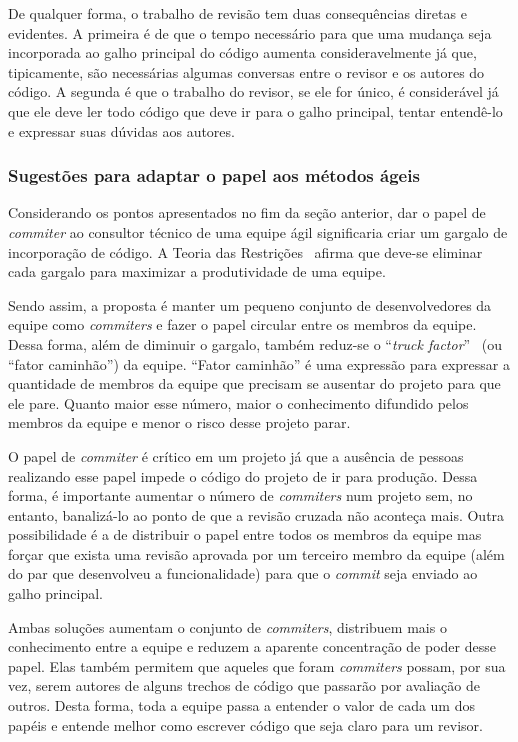 De qualquer forma, o trabalho de revisão tem duas consequências
diretas e evidentes. A primeira é de que o tempo necessário para que
uma mudança seja incorporada ao galho principal do código aumenta
consideravelmente já que, tipicamente, são necessárias algumas
conversas entre o revisor e os autores do código. A segunda é que o
trabalho do revisor, se ele for único, é considerável já que ele deve
ler todo código que deve ir para o galho principal, tentar
entendê-lo e expressar suas dúvidas aos autores.

\subsubsection{Sugestões para adaptar o papel aos métodos ágeis}

Considerando os pontos apresentados no fim da seção anterior, dar o
papel de \emph{commiter} ao consultor técnico de uma equipe ágil
significaria criar um gargalo de incorporação de código. A Teoria das
Restrições~\cite{goldratt84} afirma que deve-se eliminar cada gargalo
para maximizar a produtividade de uma equipe.

Sendo assim, a proposta é manter um pequeno conjunto de
desenvolvedores da equipe como \emph{commiters} e fazer o papel
circular entre os membros da equipe. Dessa forma, além de diminuir o
gargalo, também reduz-se o ``\textit{truck
  factor}''~\cite{Williams2002} (ou ``fator caminhão'') da
equipe. ``Fator caminhão'' é uma expressão para expressar a quantidade
de membros da equipe que precisam se ausentar do projeto para que ele
pare. Quanto maior esse número, maior o conhecimento difundido pelos
membros da equipe e menor o risco desse projeto parar.

O papel de \emph{commiter} é crítico em um projeto já que a ausência
de pessoas realizando esse papel impede o código do projeto de ir para
produção. Dessa forma, é importante aumentar o número de
\emph{commiters} num projeto sem, no entanto, banalizá-lo ao ponto de
que a revisão cruzada não aconteça mais. Outra possibilidade é a de
distribuir o papel entre todos os membros da equipe mas forçar que
exista uma revisão aprovada por um terceiro membro da equipe (além do
par que desenvolveu a funcionalidade) para que o \emph{commit} seja
enviado ao galho principal.

Ambas soluções aumentam o conjunto de \emph{commiters}, distribuem
mais o conhecimento entre a equipe e reduzem a aparente concentração
de poder desse papel. Elas também permitem que aqueles que foram
\emph{commiters} possam, por sua vez, serem autores de alguns trechos
de código que passarão por avaliação de outros. Desta forma, toda a
equipe passa a entender o valor de cada um dos papéis e entende melhor
como escrever código que seja claro para um revisor.

